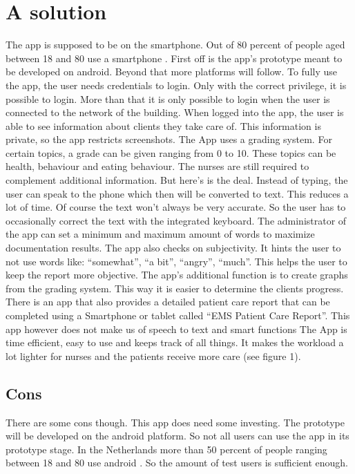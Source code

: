 \documentclass{article}
\begin{document}
\section{A solution}
The app is supposed to be on the smartphone. Out of 80 percent of people aged between 18 and 80  use a smartphone \cite{4}. First off is the app’s prototype meant to be developed on android. Beyond that more platforms will follow. To fully use the app, the user needs credentials to login. Only with the correct privilege, it is possible to login. More than that it is only possible to login when the user is connected to the network of the building. When logged into the app, the user is able to see information about clients they take care of. This information is private, so the app restricts screenshots. 
The App uses a grading system. For certain topics, a grade can be given ranging from 0 to 10. These topics can be health, behaviour and eating behaviour. The nurses are still required to complement additional information. But here’s is the deal. Instead of typing, the user can speak to the phone which then will be converted to text. This reduces a lot of time. Of course the text won’t always be very accurate. So the user has to occasionally correct the text with the integrated keyboard. The administrator of the app can set a minimum and maximum amount of words to maximize documentation results. The app also checks on subjectivity. It hints the user to not use words like: “somewhat”, “a bit”, “angry”, “much”. This helps the user to keep the report more objective. The app’s additional function is to create graphs from the grading system. This way it is easier to determine the clients progress. There is an app that also provides a detailed patient care report that can be completed using a Smartphone or tablet called “EMS Patient Care Report”. This app however does not make us of speech to text and smart functions
The App is time efficient, easy to use and keeps track of all things. It makes the workload a lot lighter for nurses and the patients receive more care (see figure 1). 


\subsection{Cons}
There are some cons though. This app does need some investing. The prototype will be developed on the android platform. So not all users can use the app in its prototype stage. In the Netherlands more than 50 percent of people ranging between 18 and 80 use android \cite{4}. So the amount of test users is sufficient enough.
\end{document}
